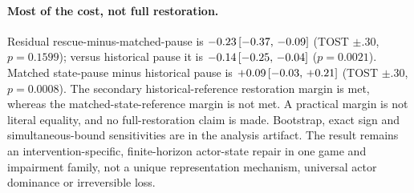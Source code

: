 \paragraph{Most of the cost, not full restoration.} Residual rescue-minus-matched-pause is $-0.23\,[-0.37,\,-0.09]$ (TOST $\pm.30$, $p=0.1599$); versus historical pause it is $-0.14\,[-0.25,\,-0.04]$ ($p=0.0021$). Matched state-pause minus historical pause is $+0.09\,[-0.03,\,+0.21]$ (TOST $\pm.30$, $p=0.0008$). The secondary historical-reference restoration margin is met, whereas the matched-state-reference margin is not met. A practical margin is not literal equality, and no full-restoration claim is made. Bootstrap, exact sign and simultaneous-bound sensitivities are in the analysis artifact. The result remains an intervention-specific, finite-horizon actor-state repair in one game and impairment family, not a unique representation mechanism, universal actor dominance or irreversible loss.
